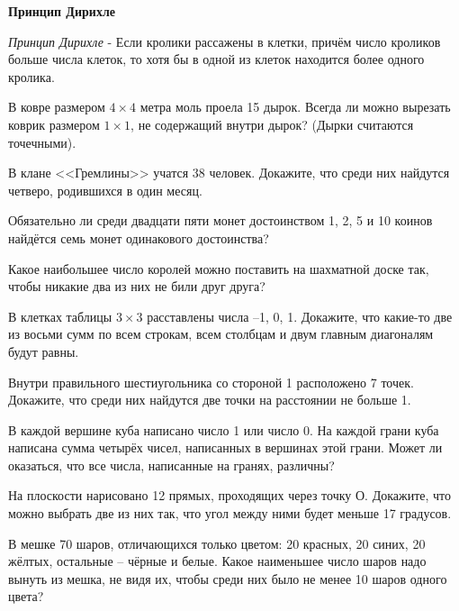 \documentclass{article}
\begin{document}
    \large

    \begin{center}
        \textbf{Принцип Дирихле}
    \end{center}


    \textit{Принцип Дирихле} - Если кролики рассажены в клетки, причём число кроликов больше числа клеток, то хотя бы в одной из клеток находится более одного кролика.

    \begin{enumerate_boxed}

        \item В ковре размером $4 \times 4$ метра моль проела 15 дырок.
        Всегда ли можно вырезать коврик размером $1 \times 1$, не содержащий внутри дырок?
        (Дырки считаются точечными).

        \item В клане <<Гремлины>> учатся 38 человек.
        Докажите, что среди них найдутся четверо, родившихся в один месяц.

        \item Обязательно ли среди двадцати пяти монет достоинством 1, 2, 5 и 10 коинов найдётся семь монет одинакового достоинства?

        \item Какое наибольшее число королей можно поставить на шахматной доске так, чтобы никакие два из них не били друг друга?

        \item В клетках таблицы $3 \times 3$ расставлены числа –1, 0, 1.
        Докажите, что какие-то две из восьми сумм по всем строкам, всем столбцам и двум главным диагоналям будут равны.

        \item Внутри правильного шестиугольника со стороной 1 расположено 7 точек.
        Докажите, что среди них найдутся две точки на расстоянии не больше 1.

        \item В каждой вершине куба написано число 1 или число 0.
        На каждой грани куба написана сумма четырёх чисел, написанных в вершинах этой грани.
        Может ли оказаться, что все числа, написанные на гранях, различны?

        \item На плоскости нарисовано 12 прямых, проходящих через точку О.
        Докажите, что можно выбрать две из них так, что угол между ними будет меньше 17 градусов.

        \item В мешке 70 шаров, отличающихся только цветом: 20 красных, 20 синих, 20 жёлтых, остальные – чёрные и белые.
        Какое наименьшее число шаров надо вынуть из мешка, не видя их, чтобы среди них было не менее 10 шаров одного цвета?


\end{enumerate_boxed}
\end{document}
